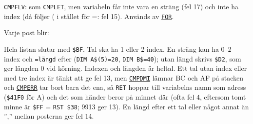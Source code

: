 \begin{Listing}
\Gap
\begin{Cmt}\par\noindent \hyperlink{l:CMPFLV}{\texttt{CMPFLV}}: som \hyperlink{l:CMPLET}{\texttt{CMPLET}}, men variabeln får inte vara en sträng (fel 17) och inte ha index (då följer {}({} i stället för {}={}: fel 15). Används av \hyperlink{l:FOR}{\texttt{FOR}}.\par\end{Cmt}
\Gap
{}
\begin{Note}\begin{Verb}
\end{Verb}
\par\noindent Varje post blir:\par
\begin{Verb}
\end{Verb}
\par\noindent Hela listan slutar med \texttt{\$BF}. Tal ska ha 1 eller 2 index. En sträng kan ha 0–2 index och \texttt{=längd} efter (\texttt{DIM A\$(5)=20}, \texttt{DIM B\$=40}); utan längd skrivs \texttt{\$D2}, som ger längden 0 vid körning. Indexen och längden är heltal. Ett tal utan index eller med tre index är tänkt att ge fel 13, men \hyperlink{l:CMPDMI}{\texttt{CMPDMI}} lämnar BC och AF på stacken och \hyperlink{l:CMPERR}{\texttt{CMPERR}} tar bort bara det ena, så \texttt{RET} hoppar till variabelns namn som adress (\texttt{\$41F0} för A) och det som händer beror på minnet där (ofta fel 4, eftersom tomt minne är \texttt{\$FF} = \texttt{RST \$38}; 9913 ger 13). En längd efter ett tal eller något annat än ”,” mellan posterna ger fel 14.\par\end{Note}

\end{Listing}
